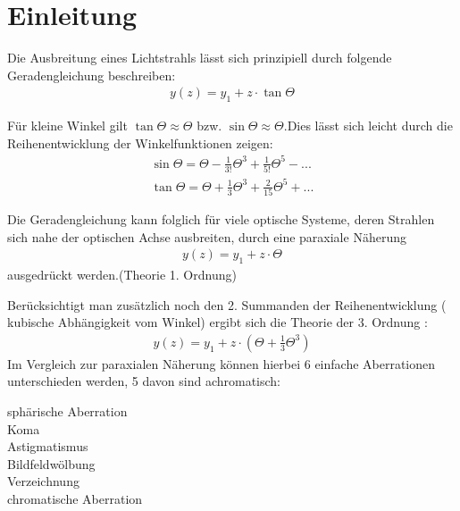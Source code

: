 \section{Einleitung}

Die Ausbreitung eines Lichtstrahls lässt sich prinzipiell durch folgende Geradengleichung beschreiben:
\begin{align*}
y(z)=y_1 + z \cdot \tan \Theta
\end{align*}

Für kleine Winkel gilt $\tan\Theta \approx \Theta$ bzw. $\sin \Theta \approx \Theta $.Dies lässt sich leicht durch die Reihenentwicklung der Winkelfunktionen zeigen:
\begin{align*}
\sin \Theta = \Theta - \frac{1}{3!}\Theta^3 + \frac{1}{5!}\Theta^5 - ... \\
\tan \Theta = \Theta + \frac{1}{3}\Theta^3 + \frac{2}{15}\Theta^5 + ...
\end{align*}

Die Geradengleichung kann folglich für viele optische Systeme, deren Strahlen sich nahe der optischen Achse ausbreiten, durch eine paraxiale Näherung 
\begin{align*}
y(z)=y_1 + z \cdot \Theta
\end{align*}
ausgedrückt werden.(Theorie 1. Ordnung) 

Berücksichtigt man zusätzlich noch den 2. Summanden der Reihenentwicklung ( kubische Abhängigkeit vom Winkel) ergibt sich die Theorie der 3. Ordnung :
\begin{align*}
y(z)=y_1 + z \cdot (\Theta + \frac{1}{3}\Theta^3)
\end{align*}
Im Vergleich zur paraxialen Näherung können hierbei 6 einfache Aberrationen unterschieden werden, 5 davon sind achromatisch:
\begin{description}
	\item[sphärische Aberration]
	\item[Koma]
	\item[Astigmatismus]
	\item[Bildfeldwölbung]
	\item[Verzeichnung]
	\item[chromatische Aberration]
\end{description}